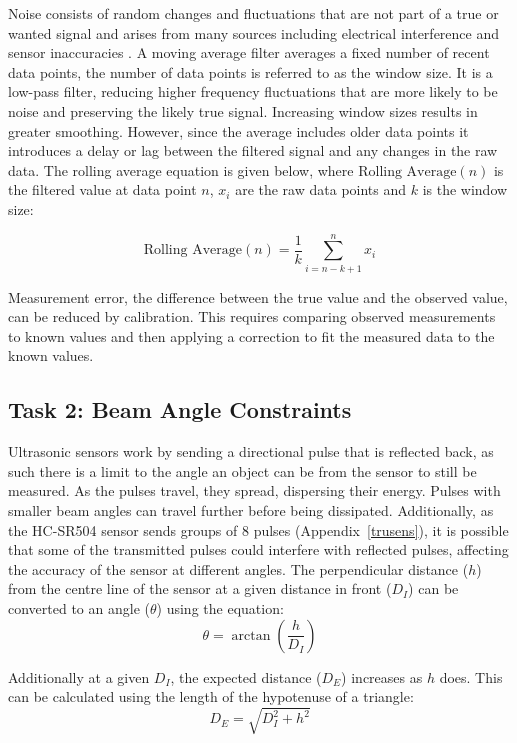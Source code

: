 \documentclass[a4paper,12pt]{article}
\begin{document}
Noise consists of random changes and fluctuations that are not part of a true or wanted signal and arises from many sources including electrical interference and sensor inaccuracies \parencite{Tuzlukov2002}. A moving average filter averages a fixed number of recent data points, the number of data points is referred to as the window size. It is a low-pass filter, reducing higher frequency fluctuations that are more likely to be noise and preserving the likely true signal. Increasing window sizes results in greater smoothing. However, since the average includes older data points it introduces a delay or lag between the filtered signal and any changes in the raw data.
The rolling average equation is given below, where $\text{Rolling Average}(n)$ is the filtered value at data point $n$, $x_i$ are the raw data points and $k$ is the window size:

\begin{equation}
\text{Rolling Average}(n) = \frac{1}{k} \sum_{i=n-k+1}^{n} x_i
\end{equation}


Measurement error, the difference between the true value and the observed value, can be reduced by calibration. This requires comparing observed measurements to known values and then applying a correction to fit the measured data to the known values.


\subsection{Task 2: Beam Angle Constraints}
Ultrasonic sensors work by sending a directional pulse that is reflected back, as such there is a limit to the angle an object can be from the sensor to still be measured. As the pulses travel, they spread, dispersing their energy. Pulses with smaller beam angles can travel further before being dissipated. Additionally, as the HC-SR504 sensor sends groups of 8 pulses (Appendix~\ref{trusens}), it is possible that some of the transmitted pulses could interfere with reflected pulses, affecting the accuracy of the sensor at different angles. 
The perpendicular distance ($h$) from the centre line of the sensor at a given distance in front ($D_{I}$) can be converted to an angle ($\theta$) using the equation: 
\begin{equation}
\theta = \arctan\left( \frac{h}{D_{I}} \right)
\end{equation}

Additionally at a given $D_{I}$, the expected distance ($D_{E}$) increases as $h$ does. This can be calculated using the length of the hypotenuse of a triangle:
\begin{equation}
D_{E} = \sqrt{D_{I}^2+h^2}
\label{eq:4}
\end{equation}
\end{document}
